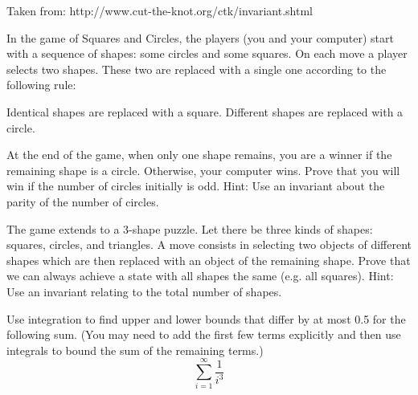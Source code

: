 \documentclass[12pt,oneside]{article}
\begin{document}
\begin{problem}{10}
Taken from: http://www.cut-the-knot.org/ctk/invariant.shtml
\bparts

In the game of Squares and Circles, the players (you and your computer) start with a sequence of shapes: some circles and some squares. On each move a player selects two shapes. These two are replaced with a single one according to the following rule:

Identical shapes are replaced with a square. Different shapes are replaced with a circle.

At the end of the game, when only one shape remains, you are a winner if the remaining shape is a circle. Otherwise, your computer wins. Prove that you will win if the number of circles initially is odd. Hint: Use an invariant about the parity of the number of circles.
 
The game extends to a 3-shape puzzle. Let there be three kinds of shapes: squares, circles, and triangles. A move consists in selecting two objects of different shapes which are then replaced with an object of the remaining shape. Prove that we can always achieve a state with all shapes the same (e.g. all squares). Hint: Use an invariant relating to the total number of shapes.

\eparts

\end{problem}

\begin{problem}{10}
Use integration to find upper and lower bounds that differ by at most
0.5 for the following sum.  (You may need to add the first few terms
explicitly and then use integrals to bound the sum of the remaining
terms.)
%
\[
\sum_{i=1}^{\infty} \frac{1}{i^3}
\]

\end{problem}
\end{document}
